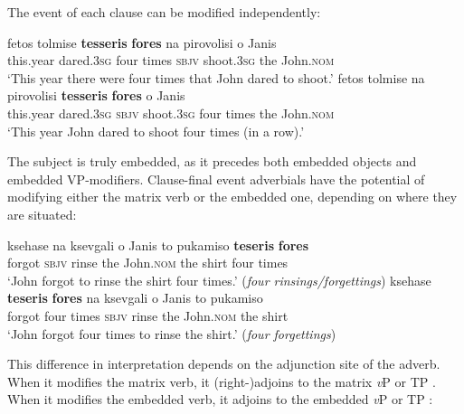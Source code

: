 \documentclass[output=paper]{langsci/langscibook}
\begin{document}
The event of each clause can be modified independently:

\ea%
    \label{ex:alexiadou:8}
\ea \gll  fetos  tolmise     \textbf{tesseris}  \textbf{fores} na   pirovolisi  o    Janis\\
      this.year dared.\textsc{3sg}  four    times  \textsc{sbjv} shoot.\textsc{3sg}   the  John.\textsc{nom}\\
\glt  ‘This year there were four times that John dared to shoot.’ 
\ex
\gll fetos  tolmise  na    pirovolisi  \textbf{tesseris}  \textbf{fores} o    Janis\\
     this.year  dared.\textsc{3sg}  \textsc{sbjv} shoot.\textsc{3sg}   four  times  the  John.\textsc{nom}\\
\glt ‘This year John dared to shoot four times (in a row).’
\z
\z

The subject is truly embedded, as it precedes both embedded objects and embedded VP-modifiers. Clause-final event adverbials have the potential of modifying either the matrix verb or the embedded one, depending on where they are situated:



\ea%
    \label{ex:alexiadou:9}
\ea \gll  ksehase  na    ksevgali  o    Janis       to    pukamiso  \textbf{teseris}  \textbf{fores}\\
      forgot   \textsc{sbjv} rinse   the  John.\textsc{nom} the  shirt        four     times\\
  \glt    ‘John forgot to rinse the shirt four times.’ (\textit{four rinsings\slash forgettings})
\ex  \gll  ksehase  \textbf{teseris}  \textbf{fores} na  ksevgali  o    Janis      to  pukamiso\\
      forgot  four   times  \textsc{sbjv}  rinse  the  John.\textsc{nom} the  shirt\\
   \glt   ‘John forgot four times to rinse the shirt.’ (\textit{four forgettings})
   \z   
\z

This difference in interpretation depends on the adjunction site of the adverb. When it modifies the matrix verb, it (right-)adjoins to the matrix \textit{v}P or TP . When it modifies the embedded verb, it adjoins to the embedded \textit{v}P or TP :
\end{document}
